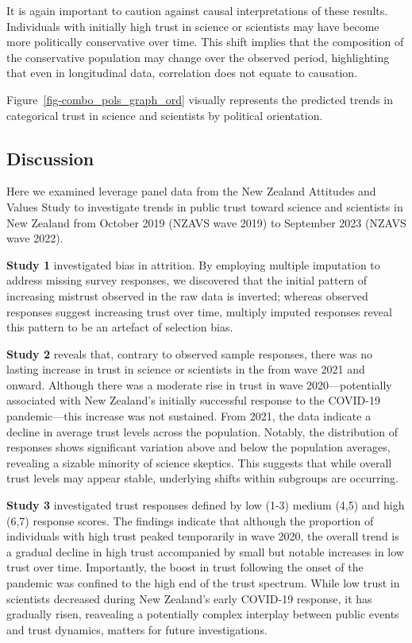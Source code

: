 \documentclass[
  single column]{article}
\begin{document}
It is again important to caution against causal interpretations of these
results. Individuals with initially high trust in science or scientists
may have become more politically conservative over time. This shift
implies that the composition of the conservative population may change
over the observed period, highlighting that even in longitudinal data,
correlation does not equate to causation.

Figure~\ref{fig-combo_pols_graph_ord} visually represents the predicted
trends in categorical trust in science and scientists by political
orientation.

\subsection{Discussion}\label{discussion}

Here we examined leverage panel data from the New Zealand Attitudes and
Values Study to investigate trends in public trust toward science and
scientists in New Zealand from October 2019 (NZAVS wave 2019) to
September 2023 (NZAVS wave 2022).

\textbf{Study 1} investigated bias in attrition. By employing multiple
imputation to address missing survey responses, we discovered that the
initial pattern of increasing mistrust observed in the raw data is
inverted; whereas observed responses suggest increasing trust over time,
multiply imputed responses reveal this pattern to be an artefact of
selection bias.

\textbf{Study 2} reveals that, contrary to observed sample responses,
there was no lasting increase in trust in science or scientists in the
from wave 2021 and onward. Although there was a moderate rise in trust
in wave 2020---potentially associated with New Zealand's initially
successful response to the COVID-19 pandemic---this increase was not
sustained. From 2021, the data indicate a decline in average trust
levels across the population. Notably, the distribution of responses
shows significant variation above and below the population averages,
revealing a sizable minority of science skeptics. This suggests that
while overall trust levels may appear stable, underlying shifts within
subgroups are occurring.

\textbf{Study 3} investigated trust responses defined by low (1-3)
medium (4,5) and high (6,7) response scores. The findings indicate that
although the proportion of individuals with high trust peaked
temporarily in wave 2020, the overall trend is a gradual decline in high
trust accompanied by small but notable increases in low trust over time.
Importantly, the boost in trust following the onset of the pandemic was
confined to the high end of the trust spectrum. While low trust in
scientists decreased during New Zealand's early COVID-19 response, it
has gradually risen, reavealing a potentially complex interplay between
public events and trust dynamics, matters for future investigations.
\end{document}
